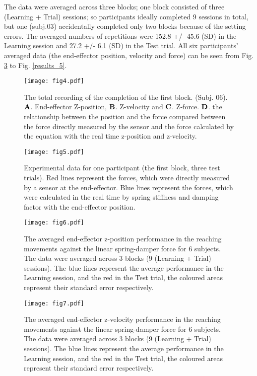 The data were averaged across three blocks; one block consisted of three
(Learning + Trial) sessions; so participants ideally completed 9 sessions in
total, but one (subj.03) accidentally completed only two blocks because of the
setting errors. The averaged numbers of repetitions were 152.8 +/- 45.6 (SD)
in the Learning session and 27.2 +/- 6.1 (SD) in the Test trial. All six
participants' averaged data (the end-effector position, velocity and force)
can be seen from Fig. \ref{results_3} to Fig. \ref{results_5}.
%
\begin{figure}
	\centering
	\texttt{[image: fig4.pdf]}
	\caption{The total recording of the completion of the first block.
		(Subj. 06). $\mathbf{A}$. End-effector Z-position, $\mathbf{B}$. Z-velocity and
		$\mathbf{C}$. Z-force.  $\mathbf{D}$. the relationship between the position and the
		force compared between the force directly measured by the sensor and the
		force calculated by the equation with the real time z-position and
		z-velocity.}
	\label{results_1}
\end{figure}
%
\begin{figure}
	\centering
	\texttt{[image: fig5.pdf]}
	\caption{Experimental data for one participant (the first block, three test 
		trials). Red lines represent the forces, which were directly measured by a 
		sensor at the end-effector. Blue lines represent the forces, which were 
		calculated in the real time by spring stiffness and damping factor with 
		the end-effector position.}
	\label{results_2}
\end{figure}
%
\begin{figure}
	\centering
	\texttt{[image: fig6.pdf]}
	\caption{The averaged end-effector z-position performance in the reaching 
		movements against the linear spring-damper force for 6 subjects. 
		The data were averaged across 3 blocks (9 (Learning + Trial) sessions). 
		The blue lines represent the average performance in the Learning session, 
		and the red in the Test trial, the coloured areas represent their standard 
		error respectively.}
	\label{results_3}
\end{figure}

\begin{figure}
	\centering
	\texttt{[image: fig7.pdf]}
	\caption{The averaged end-effector z-velocity performance in the reaching 
		movements against the linear spring-damper force for 6 subjects. 
		The data were averaged across 3 blocks (9 (Learning + Trial) sessions). 
		The blue lines represent the average performance in the Learning session, 
		and the red in the Test trial, the coloured areas represent their standard 
		error respectively.}
	\label{results_4}
\end{figure}

